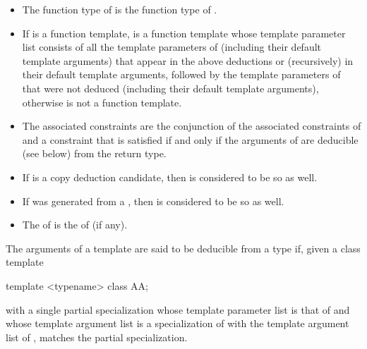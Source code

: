 \begin{itemize}
\item
The function type of  is the function type of .

\item
If  is a function template,
 is a function template whose
template parameter list consists of
all the template parameters of 
(including their default template arguments)
that appear in the above deductions or
(recursively) in their default template arguments,
followed by the template parameters of  that were not deduced
(including their default template arguments),
otherwise  is not a function template.

\item
The associated constraints are
the conjunction of the associated constraints of  and
a constraint that is satisfied if and only if
the arguments of  are deducible (see below) from the return type.

\item
If  is a copy deduction candidate,
then  is considered to be so as well.

\item
If  was generated
from a ,
then  is considered to be so as well.

\item
The  of  is
the  of  (if any).
\end{itemize}

%
\pnum
The arguments of a template  are said to be
deducible from a type  if, given a class template
\begin{codeblock}
template <typename> class AA;
\end{codeblock}
with a single partial specialization
whose template parameter list is that of  and
whose template argument list is a specialization of 
with the template argument list of ,
 matches the partial specialization.

